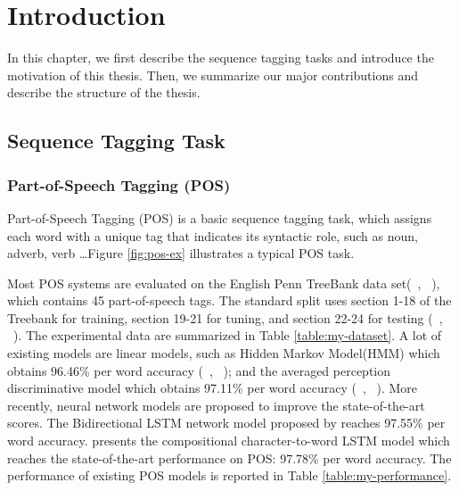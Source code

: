 \documentclass{sfuthesis}
\begin{document}
\tableofcontents\clearpage
{}\listoftables\clearpage
{}\listoffigures





%
%

\mainmatter%

\chapter{Introduction}

In this chapter, we first describe the sequence tagging tasks and introduce the motivation of this thesis. Then, we summarize our major contributions and describe the structure of the thesis.

\section{Sequence Tagging Task}

\subsection{Part-of-Speech Tagging (POS)}
Part-of-Speech Tagging (POS) is a basic sequence tagging task, which assigns each word with a unique tag that indicates its syntactic role, such as noun, adverb, verb \dots Figure \ref{fig:pos-ex} illustrates a typical POS task. 

Most POS systems are evaluated on the English Penn TreeBank data set(~\citeauthor{marcus1993building}, ~\citeyear{marcus1993building}), which contains 45 part-of-speech tags. The standard split uses section 1-18 of the Treebank for training, section 19-21 for tuning, and section 22-24 for testing (~\citeauthor{toutanova2003feature}, ~\citeyear{toutanova2003feature}). The experimental data are summarized in Table \ref{table:my-dataset}. A lot of existing models are linear models, such as Hidden Markov Model(HMM) which obtains 96.46\% per word accuracy (~\citeauthor{mccallum2000maximum}, ~\citeyear{mccallum2000maximum}); and the averaged perception discriminative model which obtains 97.11\% per word accuracy (~\citeauthor{collins2002discriminative}, ~\citeyear{collins2002discriminative}). More recently, neural network models are proposed to improve the state-of-the-art scores. The Bidirectional LSTM network model proposed by \cite{huang2015bidirectional} reaches 97.55\% per word accuracy. \cite{ling2015finding} presents the compositional character-to-word LSTM model which reaches the state-of-the-art performance on POS: 97.78\% per word accuracy. The performance of existing POS models is reported in Table \ref{table:my-performance}.
\end{document}
